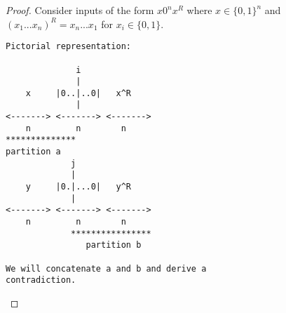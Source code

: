 \documentclass[usletter]{article}
\begin{document}
\begin{proof}
Consider inputs of the form $x 0^n x^R$ where $x \in \{0, 1\}^n$ and $(x_1...x_n)^R = x_n ... x_1$ for $x_i \in \{0, 1\}$.
\clearpage

\begin{verbatim}
Pictorial representation:

              i
              |
    x     |0..|..0|   x^R   
              |
<-------> <-------> <-------> 
    n         n        n 
************** 
partition a
             j
             |
    y     |0.|...0|   y^R   
             |
<-------> <-------> <-------> 
    n         n        n    
             **************** 
                partition b

We will concatenate a and b and derive a
contradiction.

\end{verbatim}


\end{proof}
\end{document}
